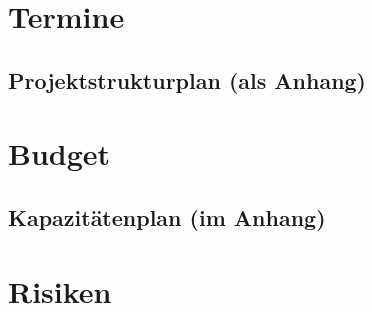 \documentclass[
11pt,
a4paper,
ngerman,
tablecaptionabove
]{article}
\begin{document}
\section{Termine}

\subsection{Projektstrukturplan (als Anhang)}

\section{Budget}

\subsection{Kapazitätenplan (im Anhang)}

\section{Risiken}
 
\end{document}
